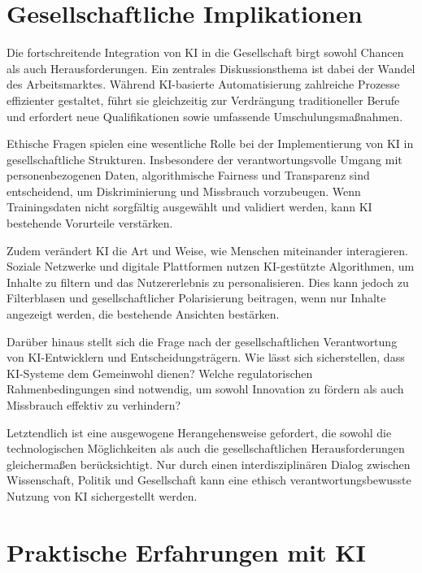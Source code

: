 \documentclass[a4paper,12pt]{article}
\begin{document}
\vspace{0.5cm}
\section{Gesellschaftliche Implikationen}

Die fortschreitende Integration von KI in die Gesellschaft birgt sowohl Chancen als auch Herausforderungen. Ein zentrales Diskussionsthema ist dabei der Wandel des Arbeitsmarktes. Während KI-basierte Automatisierung zahlreiche Prozesse effizienter gestaltet, führt sie gleichzeitig zur Verdrängung traditioneller Berufe und erfordert neue Qualifikationen sowie umfassende Umschulungsmaßnahmen.

Ethische Fragen spielen eine wesentliche Rolle bei der Implementierung von KI in gesellschaftliche Strukturen. Insbesondere der verantwortungsvolle Umgang mit personenbezogenen Daten, algorithmische Fairness und Transparenz sind entscheidend, um Diskriminierung und Missbrauch vorzubeugen. Wenn Trainingsdaten nicht sorgfältig ausgewählt und validiert werden, kann KI bestehende Vorurteile verstärken.

Zudem verändert KI die Art und Weise, wie Menschen miteinander interagieren. Soziale Netzwerke und digitale Plattformen nutzen KI-gestützte Algorithmen, um Inhalte zu filtern und das Nutzererlebnis zu personalisieren. Dies kann jedoch zu Filterblasen und gesellschaftlicher Polarisierung beitragen, wenn nur Inhalte angezeigt werden, die bestehende Ansichten bestärken.

Darüber hinaus stellt sich die Frage nach der gesellschaftlichen Verantwortung von KI-Entwicklern und Entscheidungsträgern. Wie lässt sich sicherstellen, dass KI-Systeme dem Gemeinwohl dienen? Welche regulatorischen Rahmenbedingungen sind notwendig, um sowohl Innovation zu fördern als auch Missbrauch effektiv zu verhindern?

Letztendlich ist eine ausgewogene Herangehensweise gefordert, die sowohl die technologischen Möglichkeiten als auch die gesellschaftlichen Herausforderungen gleichermaßen berücksichtigt. Nur durch einen interdisziplinären Dialog zwischen Wissenschaft, Politik und Gesellschaft kann eine ethisch verantwortungsbewusste Nutzung von KI sichergestellt werden.

\section{Praktische Erfahrungen mit KI}
\end{document}

